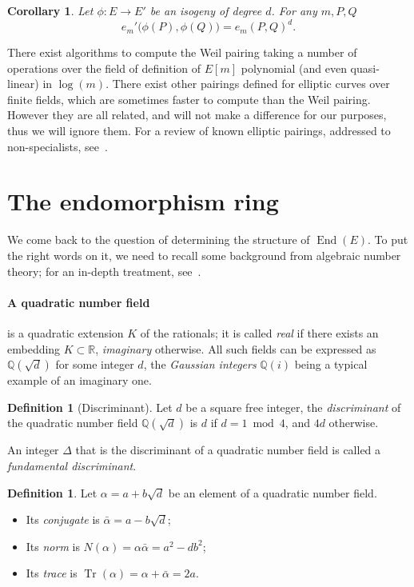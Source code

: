 \documentclass[10pt]{article}
\theoremstyle{plain}
\newtheorem{corollary}[theorem]{Corollary}
\theoremstyle{definition}
\newtheorem{definition}[theorem]{Definition}
\DeclareMathOperator{\End}{End} %
\DeclareMathOperator{\Tr}{Tr} %
\begin{document}
\begin{corollary}
  \label{coro:iso-pairing}
  Let $\phi:E\to E'$ be an isogeny of degree $d$. For any
  $m,P,Q$
  \[e_m'\bigl(\phi(P),\phi(Q)\bigr) = e_m(P,Q)^d.\]
\end{corollary}

There exist algorithms to compute the Weil pairing taking a number of
operations over the field of definition of $E[m]$ polynomial (and even
quasi-linear) in $\log(m)$. %
There exist other pairings defined for elliptic curves over finite
fields, which are sometimes faster to compute than the Weil pairing. %
However they are all related, and will not make a difference for our
purposes, thus we will ignore them. %
For a review of known elliptic pairings, addressed to non-specialists,
see~\cite{10.1016/j.dam.2007.12.010}.


\section{The endomorphism ring}
\label{sec:end(E)}

We come back to the question of determining the structure of
$\End(E)$. %
To put the right words on it, we need to recall some background from
algebraic number theory; for an in-depth treatment,
see~\cite{langANT,Voight2018}.

\paragraph{A quadratic number field} 
is a quadratic extension $K$ of the rationals; it is called
\emph{real} if there exists an embedding $K⊂ℝ$, \emph{imaginary}
otherwise. %
All such fields can be expressed as $ℚ(\sqrt{d})$ for some integer
$d$, the \emph{Gaussian integers} $ℚ(i)$ being a typical example of an
imaginary one. %

\begin{definition}[Discriminant]
  Let $d$ be a square free integer, the \emph{discriminant} of the
  quadratic number field $ℚ(\sqrt{d})$ is $d$ if $d=1\bmod 4$, and
  $4d$ otherwise.
\end{definition}

An integer $Δ$ that is the discriminant of a quadratic number field is
called a \emph{fundamental discriminant}.

\begin{definition}
  Let $α = a + b\sqrt{d}$ be an element of a quadratic number field. %
  \begin{itemize}
  \item Its \emph{conjugate} is $\bar{α} = a - b\sqrt{d}$;
  \item Its \emph{norm} is $N(α) = α\bar{α} = a^2 - db^2$;
  \item Its \emph{trace} is $\Tr(α) = α + \bar{α} = 2a$.
  \end{itemize}
\end{definition}
\end{document}
